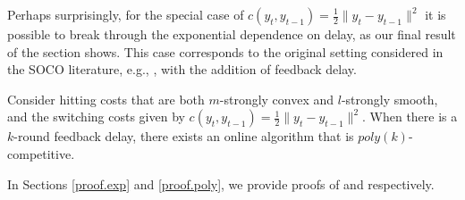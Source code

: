 Perhaps surprisingly, for the special case of $c(y_t, y_{t-1}) = \frac{1}{2}\|y_t - y_{t-1}\|^2$ it is possible to break through the exponential dependence on delay, as our final result of the section shows. This case corresponds to the original setting considered in the SOCO literature, e.g., \cite{goel2019online, goel2019beyond}, with the addition of feedback delay.

\begin{theorem}\label{t.poly_upperbound}
Consider hitting costs that are both $m$-strongly convex and $l$-strongly smooth, and the switching costs given by $c(y_t, y_{t-1}) = \frac{1}{2}\|y_t - y_{t-1}\|^2$. When there is a $k$-round feedback delay, there exists an online algorithm that is $poly(k)$-competitive.
\end{theorem}

In Sections \ref{proof.exp} and \ref{proof.poly}, we provide proofs of  and  respectively.  